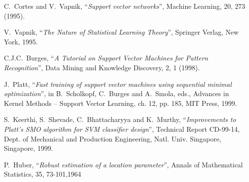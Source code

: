 \begin{thebibliography}{99}
  C.~Cortes and V.~Vapnik, 
                       ``{\em Support vector networks}'', 
                       Machine Learning, 20, 273 (1995). 

  V.~Vapnik, ``{\em The Nature of Statistical Learning Theory}'', 
                       Springer Verlag, New York, 1995.

       C.J.C.~Burges, 
                       ``{\em A Tutorial on Support Vector Machines for Pattern Recognition}'', 
                       Data Mining and Knowledge Discovery, 2, 1 (1998).

        J.~Platt,
                       ``{\em Fast training of support vector machines using sequential 
                       minimal optimization}'', 
                       in B.~Scholkopf, C.~Burges and A.~Smola, eds., 
                       Advances in Kernel Methods -- Support Vector Learning, 
                       ch. 12, pp. 185, MIT Press, 1999.

      S.~Keerthi, S.~Shevade, C.~Bhattacharyya and K.~Murthy, 
                       ``{\em Improvements to Platt's SMO algorithm for SVM classifier 
                       design}'', 
                       Technical Report CD-99-14, Dept. of Mechanical and Production Engineering, 
                       Natl. Univ. Singapore, Singapore, 1999.

	      P.~Huber,
		      ``{\em Robust estimation of a location parameter}'',
		      Annals of Mathematical Statistics, 35, 73-101,1964

\end{thebibliography}
